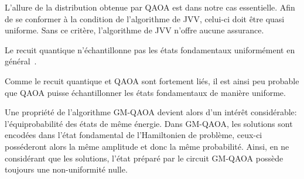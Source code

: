 L'allure de la distribution obtenue par QAOA est dans notre cas essentielle. Afin de se conformer à la condition de l'algorithme de JVV, celui-ci doit être quasi uniforme. Sans ce critère, l'algorithme de JVV n'offre aucune assurance.

Le recuit quantique n'échantillonne pas les états fondamentaux uniformément en général~\cite{matsudaGroundstateStatisticsAnnealing2009, mandraExponentiallyBiasedGroundState2017}. 


Comme le recuit quantique et QAOA sont fortement liés, il est ainsi peu probable que QAOA puisse échantillonner les états fondamentaux de manière uniforme.


Une propriété de l'algorithme GM-QAOA devient alors d'un intérêt considérable: l'équiprobabilité des états de même énergie. Dans GM-QAOA, les solutions sont encodées dans l'état fondamental de l'Hamiltonien de problème, ceux-ci posséderont alors la même amplitude et donc la même probabilité. Ainsi, en ne considérant que les solutions, l'état préparé par le circuit GM-QAOA possède toujours une non-uniformité nulle. 
